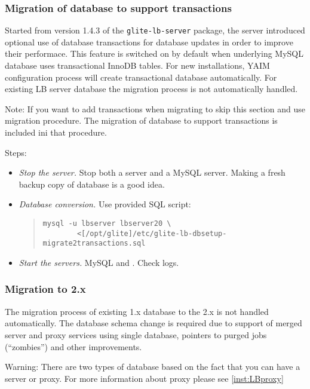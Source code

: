 \subsubsection{Migration of database to support transactions}
Started from version 1.4.3 of the \texttt{glite-lb-server}
package, the \LB server introduced optional use of database
transactions for \LB database updates in order to improve their
performace. This feature is switched on by default when underlying
MySQL database uses transactional InnoDB tables. For new
installations, YAIM configuration process will create transactional
database automatically. For existing LB server database the migration 
process is not automatically handled.

Note: If you want to add transactions when migrating to  skip
this section and use  migration procedure. The migration of
database to support transactions is included ini that procedure.

Steps:
\begin{itemize}
 \item \emph{Stop the server.} Stop both a \LB server and a MySQL
 server. Making a fresh backup copy of database is a good idea.
 \item \emph{Database conversion.} Use provided SQL script:
  \begin{quote}
   \begin{verbatim}
mysql -u lbserver lbserver20 \
        <[/opt/glite]/etc/glite-lb-dbsetup-migrate2transactions.sql
   \end{verbatim}
  \end{quote}
 \item \emph{Start the servers.} MySQL and \LB. Check logs.
\end{itemize}


\subsubsection{Migration to \LB 2.x}
\label{inst:migrate20}
The migration process of existing \LB 1.x database to the \LB 2.x is
not handled automatically. The database schema change is required due
to support of merged \LB server and proxy services using single
database, pointers to purged jobs (``zombies'') and other
improvements.

Warning: There are two types of \LB database based on the fact that
you can have a \LB server or \LB proxy. For more information about \LB
proxy please see \ref{inst:LBproxy}

